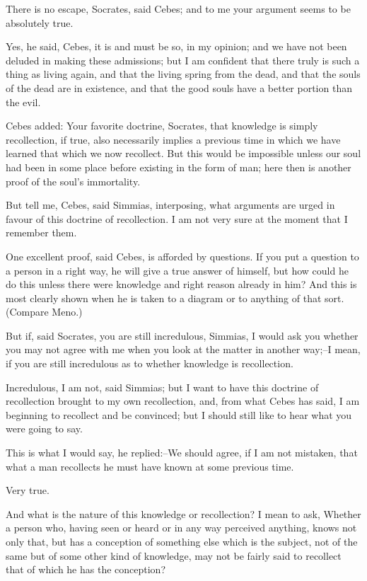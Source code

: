 There is no escape, Socrates, said Cebes; and to me your argument seems
to be absolutely true.

Yes, he said, Cebes, it is and must be so, in my opinion; and we have
not been deluded in making these admissions; but I am confident that
there truly is such a thing as living again, and that the living spring
from the dead, and that the souls of the dead are in existence, and that
the good souls have a better portion than the evil.

Cebes added: Your favorite doctrine, Socrates, that knowledge is simply
recollection, if true, also necessarily implies a previous time in
which we have learned that which we now recollect. But this would be
impossible unless our soul had been in some place before existing in the
form of man; here then is another proof of the soul's immortality.

But tell me, Cebes, said Simmias, interposing, what arguments are urged
in favour of this doctrine of recollection. I am not very sure at the
moment that I remember them.

One excellent proof, said Cebes, is afforded by questions. If you put
a question to a person in a right way, he will give a true answer of
himself, but how could he do this unless there were knowledge and right
reason already in him? And this is most clearly shown when he is taken
to a diagram or to anything of that sort. (Compare Meno.)

But if, said Socrates, you are still incredulous, Simmias, I would ask
you whether you may not agree with me when you look at the matter
in another way;--I mean, if you are still incredulous as to whether
knowledge is recollection.

Incredulous, I am not, said Simmias; but I want to have this doctrine
of recollection brought to my own recollection, and, from what Cebes has
said, I am beginning to recollect and be convinced; but I should still
like to hear what you were going to say.

This is what I would say, he replied:--We should agree, if I am not
mistaken, that what a man recollects he must have known at some previous
time.

Very true.

And what is the nature of this knowledge or recollection? I mean to
ask, Whether a person who, having seen or heard or in any way perceived
anything, knows not only that, but has a conception of something
else which is the subject, not of the same but of some other kind of
knowledge, may not be fairly said to recollect that of which he has the
conception?

